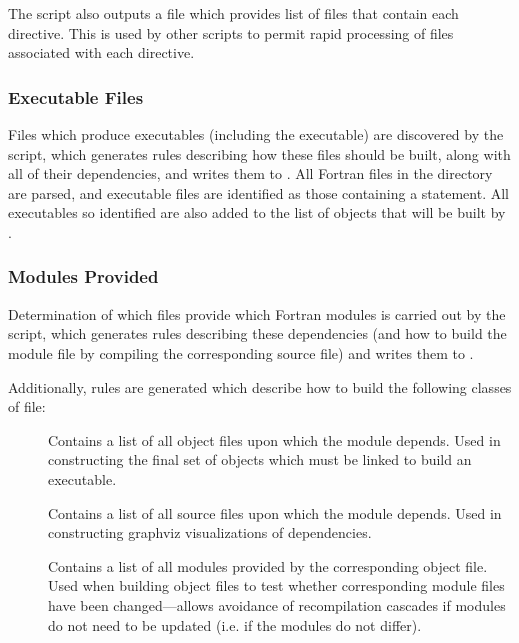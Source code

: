 The script also outputs a file  which provides list of files that contain each directive. This is used by other scripts to permit rapid processing of files associated with each directive.

\subsubsection{Executable Files}\label{sec:buildExecutables}

Files which produce executables (including the  executable) are discovered by the  script, which generates rules describing how these files should be built, along with all of their dependencies, and writes them to . All Fortran files in the  directory are parsed, and executable files are identified as those containing a  statement. All executables so identified are also added to the list of objects that will be built by .

\subsubsection{Modules Provided}\label{sec:buildModulesProvided}

Determination of which files provide which Fortran modules is carried out by the  script, which generates rules describing these dependencies (and how to build the module file by compiling the corresponding source file) and writes them to .

Additionally, rules are generated which describe how to build the following classes of file:
\begin{description}
\item[] Contains a list of all object files upon which the module depends. Used in constructing the final set of objects which must be linked to build an executable.
\item[] Contains a list of all source files upon which the module depends. Used in constructing \gls{graphviz} visualizations of dependencies.
\item[] Contains a list of all modules provided by the corresponding object file. Used when building object files to test whether corresponding module files have been changed---allows avoidance of recompilation cascades if modules do not need to be updated (i.e. if the modules do not differ).
\end{description}

